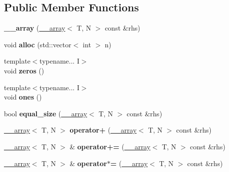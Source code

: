 \subsection*{Public Member Functions}
\begin{DoxyCompactItemize}
\item 
\hypertarget{class____array_ac3443fee161fd3f8ccb1290980a4190d}{{\bfseries \-\_\-\-\_\-array} (\hyperlink{class____array}{\-\_\-\-\_\-array}$<$ T, N $>$ const \&rhs)}\label{class____array_ac3443fee161fd3f8ccb1290980a4190d}

\item 
\hypertarget{class____array_a0ffa8a127e271c2ae60c705e5baaf6d1}{void {\bfseries alloc} (std\-::vector$<$ int $>$ n)}\label{class____array_a0ffa8a127e271c2ae60c705e5baaf6d1}

\item 
\hypertarget{class____array_aa96312fd6a92af3661cfe7c4c96768d6}{{\footnotesize template$<$typename... I$>$ }\\void {\bfseries zeros} ()}\label{class____array_aa96312fd6a92af3661cfe7c4c96768d6}

\item 
\hypertarget{class____array_a4a69efe5b113660c08fd598932836272}{{\footnotesize template$<$typename... I$>$ }\\void {\bfseries ones} ()}\label{class____array_a4a69efe5b113660c08fd598932836272}

\item 
\hypertarget{class____array_accc02e65ce775d472554778825ebdeda}{bool {\bfseries equal\-\_\-size} (\hyperlink{class____array}{\-\_\-\-\_\-array}$<$ T, N $>$ const \&rhs)}\label{class____array_accc02e65ce775d472554778825ebdeda}

\item 
\hypertarget{class____array_a435566ff4cab00684e41335595b4c60c}{\hyperlink{class____array}{\-\_\-\-\_\-array}$<$ T, N $>$ {\bfseries operator+} (\hyperlink{class____array}{\-\_\-\-\_\-array}$<$ T, N $>$ const \&rhs)}\label{class____array_a435566ff4cab00684e41335595b4c60c}

\item 
\hypertarget{class____array_a1fdacdb2b2a79effe9a11121648a3f44}{\hyperlink{class____array}{\-\_\-\-\_\-array}$<$ T, N $>$ \& {\bfseries operator+=} (\hyperlink{class____array}{\-\_\-\-\_\-array}$<$ T, N $>$ const \&rhs)}\label{class____array_a1fdacdb2b2a79effe9a11121648a3f44}

\item 
\hypertarget{class____array_a5b698b219ec8e62bab83528564caa579}{\hyperlink{class____array}{\-\_\-\-\_\-array}$<$ T, N $>$ \& {\bfseries operator$\ast$=} (\hyperlink{class____array}{\-\_\-\-\_\-array}$<$ T, N $>$ const \&rhs)}\label{class____array_a5b698b219ec8e62bab83528564caa579}


\end{DoxyCompactItemize}
